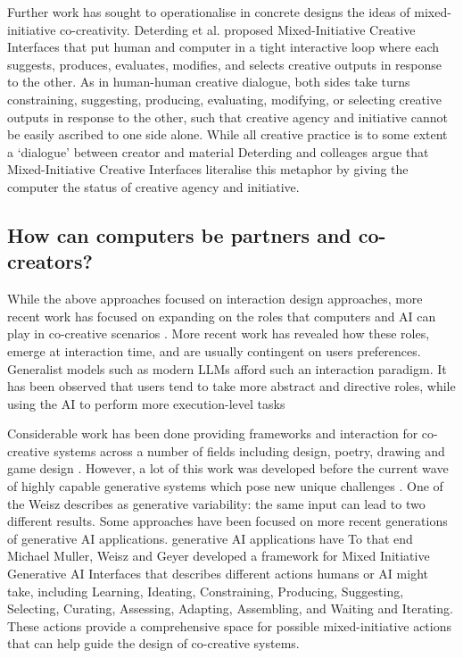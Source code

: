 Further work has sought to operationalise in concrete designs the ideas of mixed-initiative co-creativity. Deterding et al. \cite{Deterding2017-wh} proposed Mixed-Initiative Creative Interfaces that put human and computer in a tight interactive loop where each suggests, produces, evaluates, modifies, and selects creative outputs in response to the other. As in human-human creative dialogue, both sides take turns constraining, suggesting, producing, evaluating, modifying, or selecting creative outputs in response to the other, such that creative agency and initiative cannot be easily ascribed to one side alone. While all creative practice is to some extent a ‘dialogue’ between creator and material Deterding and colleages argue that Mixed-Initiative Creative Interfaces literalise this metaphor by giving the computer the status of creative agency and initiative.

\subsection{How can computers be partners and co-creators?}

While the above approaches focused on interaction design approaches, more recent work has focused on expanding on the roles that computers and AI can play in co-creative scenarios \cite{Kantosalo2021-mp, Guzdial2019-pf}. More recent work has revealed how these roles, emerge at interaction time, and are usually contingent on users preferences. Generalist models such as modern LLMs afford such an interaction paradigm. It has been observed that users tend to take more abstract and directive roles, while using the AI to perform more execution-level tasks \cite{Palani2024-on}

Considerable work has been done providing frameworks and interaction for co-creative systems across a number of fields including design, poetry, drawing and game design \cite{Guzdial2019-gr, Kim2021-zg, Rezwana2023-gj, Kim2021-fh}. However, a lot of this work was developed before the current wave of highly capable generative systems which pose new unique challenges \cite{Weisz2023-ee}. One of the Weisz describes as generative variability: the same input can lead to two different results. Some approaches have been focused on more recent generations of generative AI applications. generative AI applications have To that end Michael Muller, Weisz and Geyer developed a framework for Mixed Initiative Generative AI Interfaces \cite{Weisz2024-io, Muller2020-nv} that describes different actions humans or AI might take, including Learning, Ideating, Constraining, Producing, Suggesting, Selecting, Curating, Assessing, Adapting, Assembling, and Waiting and Iterating. These actions provide a comprehensive space for possible mixed-initiative actions that can help guide the design of co-creative systems. 

